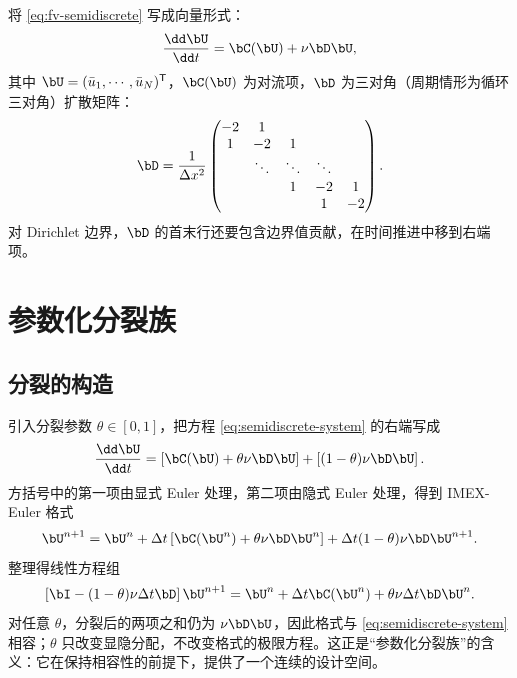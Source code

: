 将 \eqref{eq:fv-semidiscrete} 写成向量形式：
\begin{equation}
  \frac{\dd\bU}{\dd t}=\bC(\bU)+\nu\bD\bU,
  \label{eq:semidiscrete-system}
\end{equation}
其中 $\bU=(\bar u_1,\cdots,\bar u_N)^{\mathsf T}$，$\bC(\bU)$ 为对流项，$\bD$ 为三对角（周期情形为循环三对角）扩散矩阵：
\begin{equation}
  \bD=\frac{1}{\Delta x^2}
  \begin{pmatrix}
    -2 & 1 & & & \\
    1 & -2 & 1 & & \\
      & \ddots & \ddots & \ddots & \\
      & & 1 & -2 & 1\\
      & & & 1 & -2
  \end{pmatrix}.
  \label{eq:laplacian-matrix}
\end{equation}
对 Dirichlet 边界，$\bD$ 的首末行还要包含边界值贡献，在时间推进中移到右端项。

\section{参数化分裂族}
\label{sec:theta-family}

\subsection{分裂的构造}

引入分裂参数 $\theta\in[0,1]$，把方程 \eqref{eq:semidiscrete-system} 的右端写成
\begin{equation}
  \frac{\dd\bU}{\dd t}
  =\left[\bC(\bU)+\theta\nu\bD\bU\right]
  +\left[(1-\theta)\nu\bD\bU\right].
  \label{eq:theta-split}
\end{equation}
方括号中的第一项由显式 Euler 处理，第二项由隐式 Euler 处理，得到 IMEX-Euler 格式
\begin{equation}
  \bU^{n+1}=\bU^n+\Delta t\left[\bC(\bU^n)+\theta\nu\bD\bU^n\right]
  +\Delta t(1-\theta)\nu\bD\bU^{n+1}.
  \label{eq:theta-imex}
\end{equation}
整理得线性方程组
\begin{equation}
  \left[\bI-(1-\theta)\nu\Delta t\bD\right]\bU^{n+1}
  =\bU^n+\Delta t\bC(\bU^n)+\theta\nu\Delta t\bD\bU^n.
  \label{eq:theta-linear-system}
\end{equation}
对任意 $\theta$，分裂后的两项之和仍为 $\nu\bD\bU$，因此格式与 \eqref{eq:semidiscrete-system} 相容；$\theta$ 只改变显隐分配，不改变格式的极限方程。这正是“参数化分裂族”的含义：它在保持相容性的前提下，提供了一个连续的设计空间。

